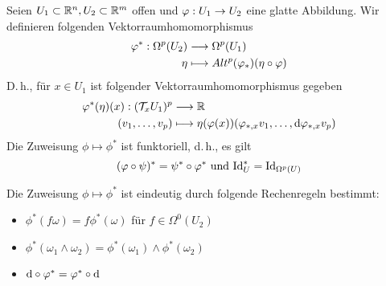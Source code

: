 \Def{}
Seien $U_1\subset \mathbb{R}^n,U_2\subset \mathbb{R}^m$ offen und $\varphi : U_1 \overset{}{\rightarrow}U_2$ eine glatte Abbildung. Wir definieren folgenden Vektorraumhomomorphismus
\begin{align*}
\varphi^* :  \Omega^p(U_2) & \overset{}{\longrightarrow} \Omega^p(U_1)\\
\eta & \longmapsto Alt^p( \varphi_*) ( \eta \circ \varphi)
\end{align*}
D.\,h., für $x \in U_1$ ist folgender Vektorraumhomomorphismus gegeben
\begin{align*}
\varphi^*(\eta)(x) : (\mathcal{T}_x U_1)^p & \overset{}{\longrightarrow} \mathbb{R}\\
(v_1, \ldots, v_p) & \longmapsto \eta(\varphi(x))( \varphi_{*,x} v_1, \ldots, \text{d} \varphi_{*,x} v_p)
\end{align*}
\Bem{}
Die Zuweisung $\phi \mapsto \phi^*$ ist funktoriell, d.\,h., es gilt
\[ (\varphi \circ \psi)^* = \psi^* \circ \varphi^* \text{ und } \text{Id}_{U}^* = \text{Id}_{\Omega^p(U)} \]

\Bem{}
Die Zuweisung $\phi \mapsto \phi^*$ ist eindeutig durch folgende Rechenregeln bestimmt:
\begin{itemize}
	\item $\phi^*(f\omega) = f \phi^*(\omega)$ für $f \in \Omega^0(U_2)$
	\item $\phi^*(\omega_1 \wedge \omega_2) = \phi^*(\omega_1) \wedge \phi^*(\omega_2)$
	\item $\text{d} \circ \varphi^* = \varphi^* \circ \text{d} $
\end{itemize}

